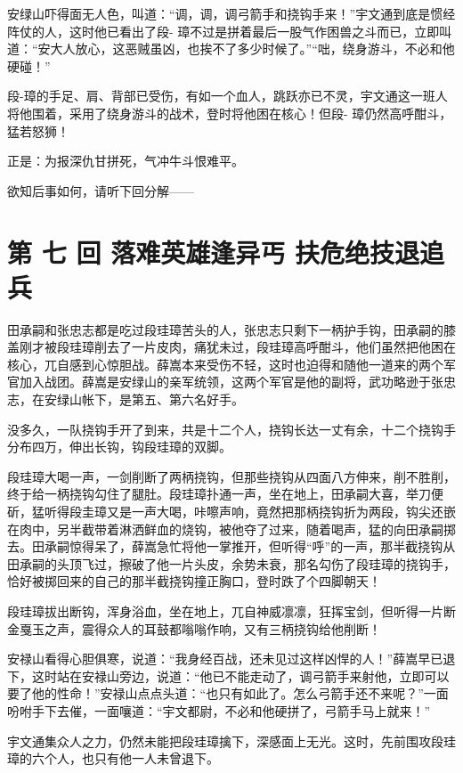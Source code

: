 \documentclass[12pt,oneside]{book}
\begin{document}
安绿山吓得面无人色，叫道：``调，调，调弓箭手和挠钩手来！''宇文通到底是惯经阵仗的人，这时他已看出了段-
璋不过是拼着最后一股气作困兽之斗而已，立即叫道：``安大人放心，这恶贼虽凶，也挨不了多少时候了。''``咄，绕身游斗，不必和他硬碰！''

段-璋的手足、肩、背部已受伤，有如一个血人，跳跃亦已不灵，宇文通这一班人将他围着，采用了绕身游斗的战术，登时将他困在核心！但段-
璋仍然高呼酣斗，猛若怒狮！

正是：为报深仇甘拼死，气冲牛斗恨难平。

欲知后事如何，请听下回分解------

\chapter{第 七 回 落难英雄逢异丐
扶危绝技退追兵}\label{ux7b2c-ux4e03-ux56de-ux843dux96beux82f1ux96c4ux9022ux5f02ux4e10-ux6276ux5371ux7eddux6280ux9000ux8ffdux5175}

田承嗣和张忠志都是吃过段珪璋苦头的人，张忠志只剩下一柄护手钩，田承嗣的膝盖刚才被段珪璋削去了一片皮肉，痛犹未过，段珪璋高呼酣斗，他们虽然把他困在核心，兀自感到心惊胆战。薛嵩本来受伤不轻，这时也迫得和随他一道来的两个军官加入战团。薛嵩是安绿山的亲军统领，这两个军官是他的副将，武功略逊于张忠志，在安绿山帐下，是第五、第六名好手。

没多久，一队挠钩手开了到来，共是十二个人，挠钩长达一丈有余，十二个挠钩手分布四万，伸出长钩，钩段珪璋的双脚。

段珪璋大喝一声，一剑削断了两柄挠钩，但那些挠钩从四面八方伸来，削不胜削，终于给一柄挠钩勾住了腿肚。段珪璋扑通一声，坐在地上，田承嗣大喜，举刀便斫，猛听得段圭璋又是一声大喝，咔嚓声响，竟然把那柄挠钩折为两段，钩尖还嵌在肉中，另半截带着淋洒鲜血的烧钩，被他夺了过来，随着喝声，猛的向田承嗣掷去。田承嗣惊得呆了，薛嵩急忙将他一掌推开，但听得``呼''的一声，那半截挠钩从田承嗣的头顶飞过，擦破了他一片头皮，余势未衰，那名勾伤了段珪璋的挠钩手，恰好被掷回来的自己的那半截挠钩撞正胸口，登时跌了个四脚朝天！

段珪璋拔出断钩，浑身浴血，坐在地上，兀自神威凛凛，狂挥宝剑，但听得一片断金戛玉之声，震得众人的耳鼓都嗡嗡作响，又有三柄挠钩给他削断！

安禄山看得心胆俱寒，说道：``我身经百战，还未见过这样凶悍的人！''薛嵩早已退下，这时站在安禄山旁边，说道：``他已不能走动了，调弓箭手来射他，立即可以要了他的性命！''安禄山点点头道：``也只有如此了。怎么弓箭手还不来呢？''一面吩咐手下去催，一面嚷道：``宇文都尉，不必和他硬拼了，弓箭手马上就来！''

宇文通集众人之力，仍然未能把段珪璋擒下，深感面上无光。这时，先前围攻段珪璋的六个人，也只有他一人未曾退下。
\end{document}
